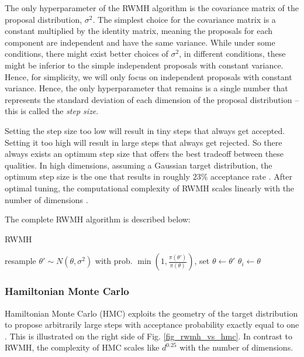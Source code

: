 \documentclass[12pt]{article}
\begin{document}
The only hyperparameter of the RWMH algorithm is the covariance matrix of the proposal distribution, $\sigma^2$. The simplest choice for the covariance matrix is a constant multiplied by the identity matrix, meaning the proposals for each component are independent and have the same variance. While under some conditions, there might exist better choices of $\sigma^2$, in different conditions, these might be inferior to the simple independent proposals with constant variance. Hence, for simplicity, we will only focus on independent proposals with constant variance. Hence, the only hyperparameter that remains is a single number that represents the standard deviation of each dimension of the proposal distribution -- this is called the \textit{step size}.

Setting the step size too low will result in tiny steps that always get accepted. Setting it too high will result in large steps that always get rejected. So there always exists an optimum step size that offers the best tradeoff between these qualities. In high dimensions, assuming a Gaussian target distribution, the optimum step size is the one that results in roughly $23\%$ acceptance rate \cite{rwmh_accept_rate}. After optimal tuning, the computational complexity of RWMH scales linearly with the number of dimensions \cite{hmc_rwmh_scaling}.

The complete RWMH algorithm is described below:
\begin{algorithm}
\caption{RWMH}
\label{alg_rwmh}
\begin{algorithmic}
 
	\State resample $\theta' \sim N(\theta, \sigma^2)$ 
	\State with prob. $\min{(1, \frac{\pi(\theta')}{\pi(\theta)})}$, set $\theta \gets \theta'$ 
	\State $\theta_i \gets \theta$ 
\EndFor
\end{algorithmic}
\end{algorithm}

\subsubsection{Hamiltonian Monte Carlo}

Hamiltonian Monte Carlo (HMC) exploits the geometry of the target distribution to propose arbitrarily large steps with acceptance probability exactly equal to one \cite{hmc}. This is illustrated on the right side of Fig. \ref{fig_rwmh_vs_hmc}. In contrast to RWMH, the complexity of HMC scales like $d^{0.25}$ with the number of dimensions.
\end{document}
